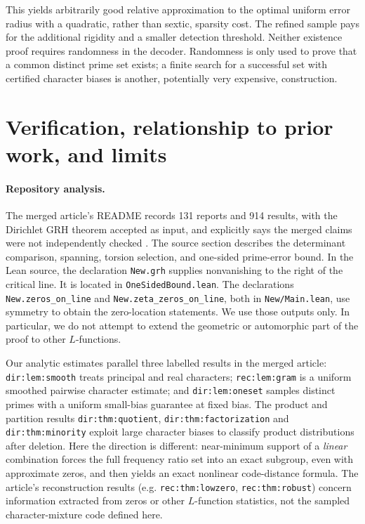 \documentclass[11pt]{article}
\theoremstyle{definition}\newtheorem{remark}[theorem]{Remark}
\begin{document}
This yields arbitrarily good relative approximation to the optimal uniform error radius with a quadratic, rather than sextic, sparsity cost. The refined sample pays for the additional rigidity and a smaller detection threshold. Neither existence proof requires randomness in the decoder. Randomness is only used to prove that a common distinct prime set exists; a finite search for a successful set with certified character biases is another, potentially very expensive, construction.

\section{Verification, relationship to prior work, and limits}
\label{sec:audit}
\paragraph{Repository analysis.} The merged article's README records 131 reports and 914 results, with the Dirichlet GRH theorem accepted as input, and explicitly says the merged claims were not independently checked \cite{article}. The source section describes the determinant comparison, spanning, torsion selection, and one-sided prime-error bound. In the Lean source, the declaration \texttt{New.grh} supplies nonvanishing to the right of the critical line. It is located in \texttt{OneSidedBound.lean}. The declarations \texttt{New.zeros\_on\_line} and \texttt{New.zeta\_zeros\_on\_line}, both in \texttt{New/Main.lean}, use symmetry to obtain the zero-location statements. We use those outputs only. In particular, we do not attempt to extend the geometric or automorphic part of the proof to other $L$-functions.

Our analytic estimates parallel three labelled results in the merged article: \texttt{dir:lem:smooth} treats principal and real characters; \texttt{rec:lem:gram} is a uniform smoothed pairwise character estimate; and \texttt{dir:lem:oneset} samples distinct primes with a uniform small-bias guarantee at fixed bias. The product and partition results \texttt{dir:thm:quotient}, \texttt{dir:thm:factorization} and \texttt{dir:thm:minority} exploit large character biases to classify product distributions after deletion. Here the direction is different: near-minimum support of a \emph{linear} combination forces the full frequency ratio set into an exact subgroup, even with approximate zeros, and then yields an exact nonlinear code-distance formula. The article's reconstruction results (e.g. \texttt{rec:thm:lowzero}, \texttt{rec:thm:robust}) concern information extracted from zeros or other $L$-function statistics, not the sampled character-mixture code defined here.
\end{document}
